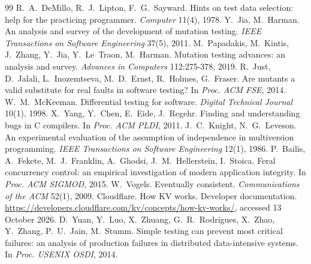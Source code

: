 \documentclass[11pt,a4paper]{article}
\begin{document}
\begin{thebibliography}{99}
 R.~A.~DeMillo, R.~J.~Lipton, F.~G.~Sayward. Hints on test data selection: help for the practicing programmer. \emph{Computer} 11(4), 1978.
 Y.~Jia, M.~Harman. An analysis and survey of the development of mutation testing. \emph{IEEE Transactions on Software Engineering} 37(5), 2011.
 M.~Papadakis, M.~Kintis, J.~Zhang, Y.~Jia, Y.~Le~Traon, M.~Harman. Mutation testing advances: an analysis and survey. \emph{Advances in Computers} 112:275-378, 2019.
 R.~Just, D.~Jalali, L.~Inozemtseva, M.~D.~Ernst, R.~Holmes, G.~Fraser. Are mutants a valid substitute for real faults in software testing? In \emph{Proc. ACM FSE}, 2014.
 W.~M.~McKeeman. Differential testing for software. \emph{Digital Technical Journal} 10(1), 1998.
 X.~Yang, Y.~Chen, E.~Eide, J.~Regehr. Finding and understanding bugs in C compilers. In \emph{Proc. ACM PLDI}, 2011.
 J.~C.~Knight, N.~G.~Leveson. An experimental evaluation of the assumption of independence in multiversion programming. \emph{IEEE Transactions on Software Engineering} 12(1), 1986.
 P.~Bailis, A.~Fekete, M.~J.~Franklin, A.~Ghodsi, J.~M.~Hellerstein, I.~Stoica. Feral concurrency control: an empirical investigation of modern application integrity. In \emph{Proc. ACM SIGMOD}, 2015.
 W.~Vogels. Eventually consistent. \emph{Communications of the ACM} 52(1), 2009.
 Cloudflare. How KV works. Developer documentation. \url{https://developers.cloudflare.com/kv/concepts/how-kv-works/}, accessed 13 October 2026.
 D.~Yuan, Y.~Luo, X.~Zhuang, G.~R.~Rodrigues, X.~Zhao, Y.~Zhang, P.~U.~Jain, M.~Stumm. Simple testing can prevent most critical failures: an analysis of production failures in distributed data-intensive systems. In \emph{Proc. USENIX OSDI}, 2014.
\end{thebibliography}
\end{document}
